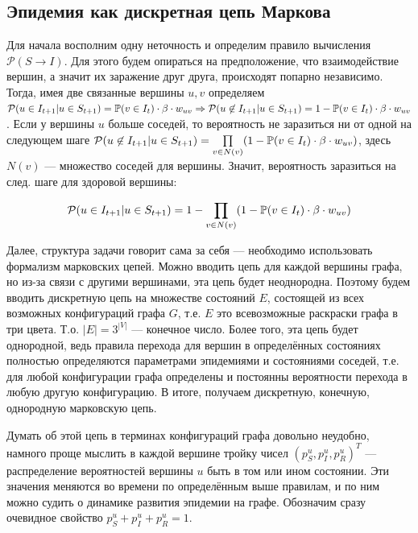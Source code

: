 	\subsection*{Эпидемия как дискретная цепь Маркова}
	
	Для начала восполним одну неточность и определим правило вычисления $\mathcal{P}(S \rightarrow I)$. Для этого будем опираться на предположение, что взаимодействие вершин, а значит их заражение друг друга, происходят попарно независимо. Тогда, имея две связанные вершины $u, v$ определяем $\mathcal{P}(u \in I_{t+1} | u \in S_{t+1}) = \mathbb{P}(v \in I_t) \cdot \beta \cdot w_{uv} \Rightarrow \mathcal{P}(u \not \in I_{t+1} | u \in S_{t+1}) = 1 - \mathbb{P}(v \in I_t) \cdot \beta \cdot w_{uv} $. Если у вершины $u$ больше соседей, то вероятность не заразиться ни от одной на следующем шаге $\mathcal{P}(u \not \in I_{t+1} | u \in S_{t+1}) = \prod\limits_{v \in N(v)} (1 - \mathbb{P}(v \in I_t) \cdot \beta \cdot w_{uv}) $, здесь $N(v)$ --- множество соседей для вершины. Значит, вероятность заразиться на след. шаге для здоровой вершины:
	
	\begin{equation}
		\mathcal{P}(u \in I_{t+1} | u \in S_{t+1}) = 1 - \prod\limits_{v \in N(v)} (1 - \mathbb{P}(v \in I_t) \cdot \beta \cdot w_{uv})
	\end{equation}
	
	Далее, структура задачи говорит сама за себя --- необходимо использовать формализм марковских цепей. Можно вводить цепь для каждой вершины графа, но из-за связи с другими вершинами, эта цепь будет неоднородна. Поэтому будем вводить дискретную цепь на множестве состояний $E$, состоящей из всех возможных конфигураций графа $G$, т.е. $E$ это всевозможные раскраски графа в три цвета. Т.о. $ \lvert E \rvert = 3^{|V|} $ --- конечное число. Более того, эта цепь будет однородной, ведь правила перехода для вершин в определённых состояниях полностью определяются параметрами эпидемиями и состояниями соседей, т.е. для любой конфигурации графа определены и постоянны вероятности перехода в любую другую конфигурацию. В итоге, получаем дискретную, конечную, однородную марковскую цепь.
	
	Думать об этой цепь в терминах конфигураций графа довольно неудобно, намного проще мыслить в каждой вершине тройку чисел $(p_S^u, p_I^u, p_R^u)^T$ --- \hypertarget{ver_distr}{распределение вероятностей} вершины $u$ быть в том или ином состоянии. Эти значения меняются во времени по определённым выше правилам, и по ним можно судить о динамике развития эпидемии на графе. Обозначим сразу очевидное свойство $p_S^u + p_I^u + p_R^u = 1$.
	

